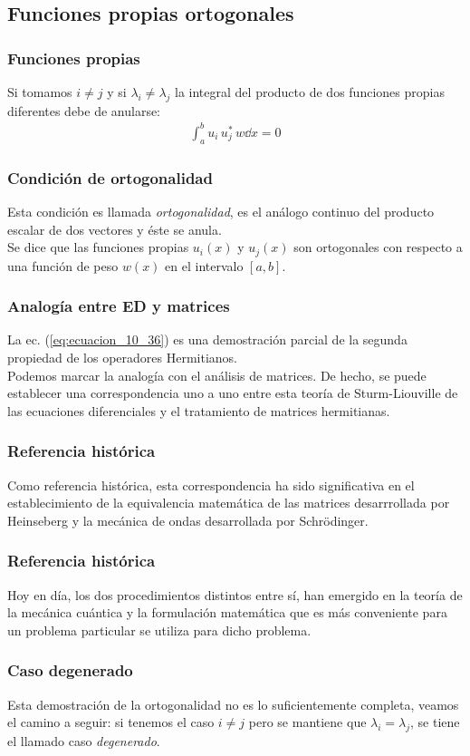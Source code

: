 \subsection{Funciones propias ortogonales}
\begin{frame}
\frametitle{Funciones propias}
Si tomamos $i \neq	j$ y si $\lambda_{i} \neq \lambda_{j}$ la integral del producto de dos funciones propias diferentes debe de anularse:
\begin{align}
\int_{a}^{b} u_{i} \, u_{j}^{*} \, w \dd{x} = 0
\label{eq:ecuacion_10_36}
\end{align}
\end{frame}
\begin{frame}
\frametitle{Condición de ortogonalidad}
Esta condición es llamada \emph{ortogonalidad}, es el análogo continuo del producto escalar de dos vectores y éste se anula.
\\
\bigskip
\pause
Se dice que las funciones propias $u_{i}(x)$ y $u_{j}(x)$ son ortogonales con respecto a una función de peso $w(x)$ en el intervalo $[a,b]$.
\end{frame}
\begin{frame}
\frametitle{Analogía entre ED y matrices}
La ec. (\ref{eq:ecuacion_10_36}) es una demostración parcial de la segunda propiedad de los operadores Hermitianos. 
\\
\bigskip
\pause
Podemos marcar la analogía con el análisis de matrices. De hecho, se puede establecer una correspondencia uno a uno entre esta teoría de Sturm-Liouville de las ecuaciones diferenciales y el tratamiento de matrices hermitianas.
\end{frame}
\begin{frame}
\frametitle{Referencia histórica}
Como referencia histórica, esta correspondencia ha sido significativa en el establecimiento de la equivalencia matemática de las matrices desarrrollada por Heinseberg y la mecánica de ondas desarrollada por Schrödinger.
\end{frame}
\begin{frame}
\frametitle{Referencia histórica}
Hoy en día, los dos procedimientos distintos entre sí, han emergido en la teoría de la mecánica cuántica y la formulación matemática que es más conveniente para un problema particular se utiliza para dicho problema.
\end{frame}
\begin{frame}
\frametitle{Caso degenerado}
Esta demostración de la ortogonalidad no es lo suficientemente completa, veamos el camino a seguir: si tenemos el caso $i \neq j$ pero se mantiene que $\lambda_{i} = \lambda_{j}$, se tiene el llamado caso \emph{degenerado}. 
\end{frame}
